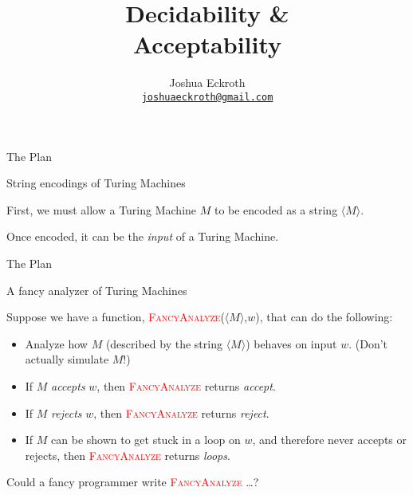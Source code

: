 \documentclass[12pt,compress]{beamer}
\title{Decidability \&\\Acceptability}
\author[Eckroth]
{Joshua Eckroth \\ \vskip 0.25in {\tt \href{mailto:joshuaeckroth@gmail.com}{joshuaeckroth@gmail.com}}}
\date{}
\newcommand{\func}[1]{\textcolor{red}{\textsc{#1}}}
\newcommand{\str}[1]{$\langle #1 \rangle$}
\begin{document}
\begin{frame}[plain]
  \titlepage
\end{frame}

\begin{frame}{The Plan}

  

\end{frame}

\begin{frame}{String encodings of Turing Machines}

  First, we must allow a Turing Machine $M$ to be encoded as a
  string \str{M}.

  \vskip 0.25in

  Once encoded, it can be the \textit{input} of a Turing Machine.

\end{frame}

\begin{frame}{The Plan}

  

\end{frame}

\begin{frame}{A fancy analyzer of Turing Machines}

  Suppose we have a function, \func{FancyAnalyze}(\str{M},$w$), that
  can do the following:

  \begin{itemize}

  \item Analyze how $M$ (described by the string \str{M})
    behaves on input $w$. (Don't actually simulate $M$!)

  \item If $M$ \textit{accepts} $w$, then \func{FancyAnalyze} returns \textit{accept}.

  \item If $M$ \textit{rejects} $w$, then \func{FancyAnalyze} returns \textit{reject}.

  \item If $M$ can be shown to get stuck in a loop on $w$, and therefore
    never accepts or rejects, then \func{FancyAnalyze} returns \textit{loops}.

  \end{itemize}

  Could a fancy programmer write \func{FancyAnalyze} \dots ?

\end{frame}
\end{document}
